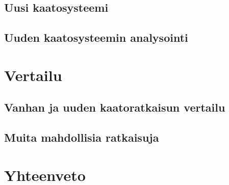 \documentclass[finnish, numeric, draft]{tauthesis}  %
\begin{document}
\section{Uusi kaatosysteemi}
\label{ch:uusi_kaato}


\section{Uuden kaatosysteemin analysointi}
\label{ch:uuden_analysointi}


\chapter{Vertailu}
\label{ch:vertailu}

\section{Vanhan ja uuden kaatoratkaisun vertailu}
\label{ch:vanhan_ja_uuden_vertailu}


\section{Muita mahdollisia ratkaisuja}
\label{ch:muut_ratkaisut}



\chapter{Yhteenveto}
\label{ch:yhteenveto}



\printbibliography[heading=bibintoc]



\end{document}
